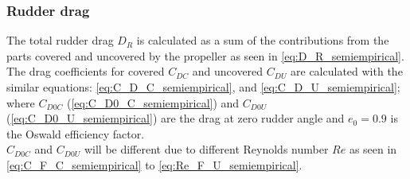 %
\begin{equation}
    \label{eq:f_semiempirical}
    
\end{equation}
%
\begin{equation}
    \label{eq:d_semiempirical}
    
\end{equation}
\begin{equation}
    \label{eq:c_semiempirical}
    
\end{equation}

\subsubsection{Rudder drag}
\label{sec:rudder_drag}
The total rudder drag $D_R$ is calculated as a sum of the contributions from the parts covered and uncovered by the propeller as seen in \autoref{eq:D_R_semiempirical}.
\begin{equation}
    \label{eq:D_R_semiempirical}
    
\end{equation}
The drag coefficients for covered $C_{DC}$ and uncovered $C_{DU}$ are calculated with the similar equations: \autoref{eq:C_D_C_semiempirical}, and \autoref{eq:C_D_U_semiempirical}; where $C_{D0C}$ (\autoref{eq:C_D0_C_semiempirical}) and $C_{D0U}$ (\autoref{eq:C_D0_U_semiempirical}) are the drag at zero rudder angle  and $e_0 = 0.9$ is the Oswald efficiency factor. 
\begin{equation}
    \label{eq:C_D_C_semiempirical}
    
\end{equation}
%
\begin{equation}
    \label{eq:C_D_U_semiempirical}
    
\end{equation}
%
\begin{equation}
    \label{eq:C_D0_C_semiempirical}
    
\end{equation}
%
\begin{equation}
    \label{eq:C_D0_U_semiempirical}
    
\end{equation}
$C_{D0C}$ and $C_{D0U}$ will be different due to different Reynolds number $Re$ as seen in \autoref{eq:C_F_C_semiempirical} to \autoref{eq:Re_F_U_semiempirical}.
